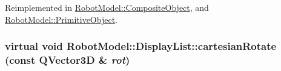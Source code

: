 Reimplemented in \hyperlink{class_robot_model_1_1_composite_object_a357f5ed3f49e0889df511271e468f866}{RobotModel::CompositeObject}, and \hyperlink{class_robot_model_1_1_primitive_object_a97b449302680b96410ff7296c794f640}{RobotModel::PrimitiveObject}.\hypertarget{class_robot_model_1_1_display_list_a023ba88eaac38b26dc9ea6a358467637}{
\subsubsection[{cartesianRotate}]{\setlength{\rightskip}{0pt plus 5cm}virtual void RobotModel::DisplayList::cartesianRotate (const QVector3D \& {\em rot})}}
\label{class_robot_model_1_1_display_list_a023ba88eaac38b26dc9ea6a358467637}


